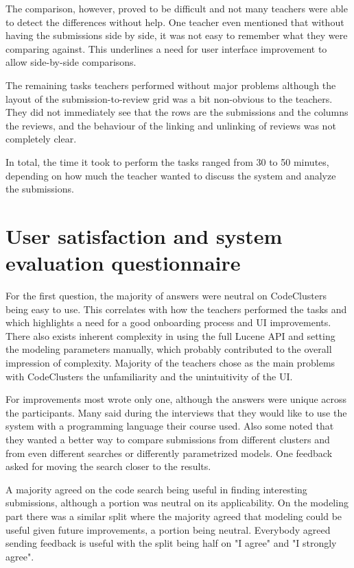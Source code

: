 The comparison, however, proved to be difficult and not many teachers were able to detect the differences without help. One teacher even mentioned that without having the submissions side by side, it was not easy to remember what they were comparing against. This underlines a need for user interface improvement to allow side-by-side comparisons.

The remaining tasks teachers performed without major problems although the layout of the submission-to-review grid was a bit non-obvious to the teachers. They did not immediately see that the rows are the submissions and the columns the reviews, and the behaviour of the linking and unlinking of reviews was not completely clear.

In total, the time it took to perform the tasks ranged from 30 to 50 minutes, depending on how much the teacher wanted to discuss the system and analyze the submissions.

\section{User satisfaction and system evaluation questionnaire}

For the first question, the majority of answers were neutral on CodeClusters being easy to use. This correlates with how the teachers performed the tasks and which highlights a need for a good onboarding process and UI improvements. There also exists inherent complexity in using the full Lucene API and setting the modeling parameters manually, which probably contributed to the overall impression of complexity. Majority of the teachers chose as the main problems with CodeClusters the unfamiliarity and the unintuitivity of the UI.

For improvements most wrote only one, although the answers were unique across the participants. Many said during the interviews that they would like to use the system with a programming language their course used. Also some noted that they wanted a better way to compare submissions from different clusters and from even different searches or differently parametrized models. One feedback asked for moving the search closer to the results.

A majority agreed on the code search being useful in finding interesting submissions, although a portion was neutral on its applicability. On the modeling part there was a similar split where the majority agreed that modeling could be useful given future improvements, a portion being neutral. Everybody agreed sending feedback is useful with the split being half on "I agree" and "I strongly agree".

